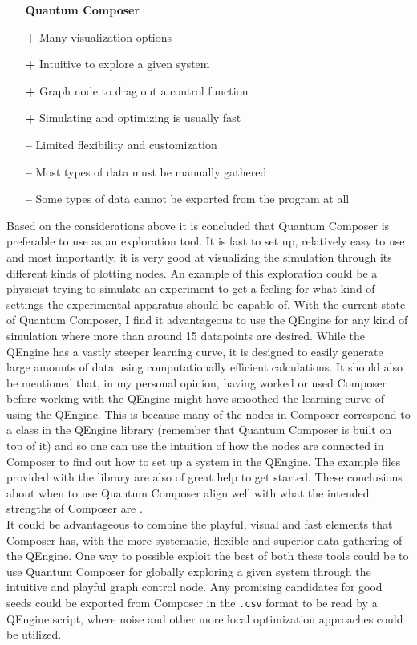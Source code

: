 \documentclass[a4paper, twocolumn]{revtex4-1}
\begin{document}
\begin{itemize}
	\item[] \textbf{Quantum Composer} 
	\item[\bf+] Many visualization options
	\item[\bf+] Intuitive to explore a given system
	\item[\bf+] Graph node to drag out a control function
	\item[\bf+] Simulating and optimizing is usually fast
	\item[\bf{--}] Limited flexibility and customization
	\item[\bf{--}] Most types of data must be manually gathered
	\item[\bf{--}] Some types of data cannot be exported from the program at all
\end{itemize}

Based on the considerations above it is concluded that Quantum Composer is preferable to use as an exploration tool. It is fast to set up, relatively easy to use and most importantly, it is very good at visualizing the simulation through its different kinds of plotting nodes. An example of this exploration could be a physicist trying to simulate an experiment to get a feeling for what kind of settings the experimental apparatus should be capable of. With the current state of Quantum Composer, I find it advantageous to use the QEngine for any kind of simulation where more than around 15 datapoints are desired. While the QEngine has a vastly steeper learning curve, it is designed to easily generate large amounts of data using computationally efficient calculations. It should also be mentioned that, in my personal opinion, having worked or used Composer before working with the QEngine might have smoothed the learning curve of using the QEngine. This is because many of the nodes in Composer correspond to a class in the QEngine library (remember that Quantum Composer is built on top of it) and so one can use the intuition of how the nodes are connected in Composer to find out how to set up a system in the QEngine. The example files provided with the library are also of great help to get started. These conclusions about when to use Quantum Composer align well with what the intended strengths of Composer are \cite{ahmed2020quantum}.\\

It could be advantageous to combine the playful, visual and fast elements that Composer has, with the more systematic, flexible and superior data gathering of the QEngine. One way to possible exploit the best of both these tools could be to use Quantum Composer for globally exploring a given system through the intuitive and playful graph control node. Any promising candidates for good seeds could be exported from Composer in the \texttt{.csv} format to be read by a QEngine script, where noise and other more local optimization approaches could be utilized.
\end{document}
